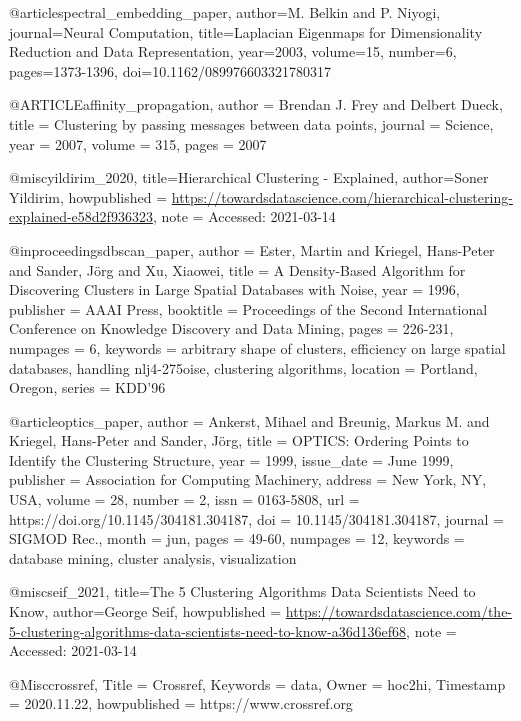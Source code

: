 @article{spectral_embedding_paper,
author={M. {Belkin} and P. {Niyogi}},
journal={Neural Computation},
title={Laplacian Eigenmaps for Dimensionality Reduction and Data Representation},
year={2003},
volume={15},
number={6},
pages={1373-1396},
doi={10.1162/089976603321780317}
}

@ARTICLE{affinity_propagation,
    author = {Brendan J. Frey and Delbert Dueck},
    title = {Clustering by passing messages between data points},
    journal = {Science},
    year = {2007},
    volume = {315},
    pages = {2007}
}

@misc{yildirim_2020,
title={Hierarchical Clustering - Explained},
author={Soner Yildirim},
howpublished = {\url{https://towardsdatascience.com/hierarchical-clustering-explained-e58d2f936323}},
note = {Accessed: 2021-03-14}
} 

@inproceedings{dbscan_paper,
author = {Ester, Martin and Kriegel, Hans-Peter and Sander, J\"{o}rg and Xu, Xiaowei},
title = {A Density-Based Algorithm for Discovering Clusters in Large Spatial Databases with Noise},
year = {1996},
publisher = {AAAI Press},
booktitle = {Proceedings of the Second International Conference on Knowledge Discovery and Data Mining},
pages = {226-231},
numpages = {6},
keywords = {arbitrary shape of clusters, efficiency on large spatial databases, handling nlj4-275oise, clustering algorithms},
location = {Portland, Oregon},
series = {KDD'96}
}

@article{optics_paper,
author = {Ankerst, Mihael and Breunig, Markus M. and Kriegel, Hans-Peter and Sander, J\"{o}rg},
title = {OPTICS: Ordering Points to Identify the Clustering Structure},
year = {1999},
issue_date = {June 1999},
publisher = {Association for Computing Machinery},
address = {New York, NY, USA},
volume = {28},
number = {2},
issn = {0163-5808},
url = {https://doi.org/10.1145/304181.304187},
doi = {10.1145/304181.304187},
journal = {SIGMOD Rec.},
month = jun,
pages = {49-60},
numpages = {12},
keywords = {database mining, cluster analysis, visualization}
}

@misc{seif_2021,
title={The 5 Clustering Algorithms Data Scientists Need to Know},
author={George Seif},
howpublished = {\url{https://towardsdatascience.com/the-5-clustering-algorithms-data-scientists-need-to-know-a36d136ef68}},
note = {Accessed: 2021-03-14}
}

@Misc{crossref,
  Title                    = {Crossref},
  Keywords                 = {data},
  Owner                    = {hoc2hi},
  Timestamp                = {2020.11.22},
  howpublished                      = {https://www.crossref.org}
}

